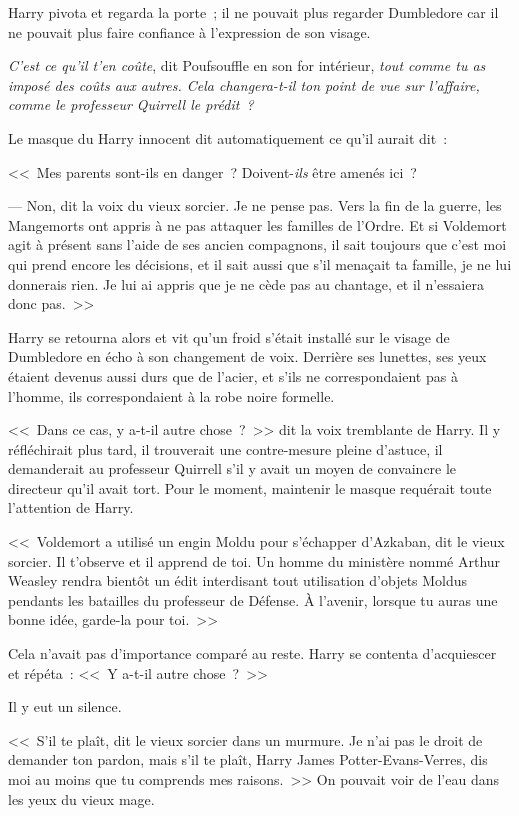 Harry pivota et regarda la porte~; il ne pouvait plus regarder Dumbledore car il ne pouvait plus faire confiance à l'expression de son visage.

\emph{C'est ce qu'il t'en coûte}, dit Poufsouffle en son for intérieur, \emph{tout comme tu as imposé des coûts aux autres. Cela changera-t-il ton point de vue sur l'affaire, comme le professeur Quirrell le prédit~?}

Le masque du Harry innocent dit automatiquement ce qu'il aurait dit~:

<<~Mes parents sont-ils en danger~? Doivent-\emph{ils} être amenés ici~?

--- Non, dit la voix du vieux sorcier. Je ne pense pas. Vers la fin de la guerre, les Mangemorts ont appris à ne pas attaquer les familles de l'Ordre. Et si Voldemort agit à présent sans l'aide de ses ancien compagnons, il sait toujours que c'est moi qui prend encore les décisions, et il sait aussi que s'il menaçait ta famille, je ne lui donnerais rien. Je lui ai appris que je ne cède pas au chantage, et il n'essaiera donc pas.~>>

Harry se retourna alors et vit qu'un froid s'était installé sur le visage de Dumbledore en écho à son changement de voix. Derrière ses lunettes, ses yeux étaient devenus aussi durs que de l'acier, et s'ils ne correspondaient pas à l'homme, ils correspondaient à la robe noire formelle.

<<~Dans ce cas, y a-t-il autre chose~?~>> dit la voix tremblante de Harry. Il y réfléchirait plus tard, il trouverait une contre-mesure pleine d'astuce, il demanderait au professeur Quirrell s'il y avait un moyen de convaincre le directeur qu'il avait tort. Pour le moment, maintenir le masque requérait toute l'attention de Harry.

<<~Voldemort a utilisé un engin Moldu pour s'échapper d'Azkaban, dit le vieux sorcier. Il t'observe et il apprend de toi. Un homme du ministère nommé Arthur Weasley rendra bientôt un édit interdisant tout utilisation d'objets Moldus pendants les batailles du professeur de Défense. À l'avenir, lorsque tu auras une bonne idée, garde-la pour toi.~>>

Cela n'avait pas d'importance comparé au reste. Harry se contenta d'acquiescer et répéta~: <<~Y a-t-il autre chose~?~>>

Il y eut un silence.

<<~S'il te plaît, dit le vieux sorcier dans un murmure. Je n'ai pas le droit de demander ton pardon, mais s'il te plaît, Harry James Potter-Evans-Verres, dis moi au moins que tu comprends mes raisons.~>> On pouvait voir de l'eau dans les yeux du vieux mage.

